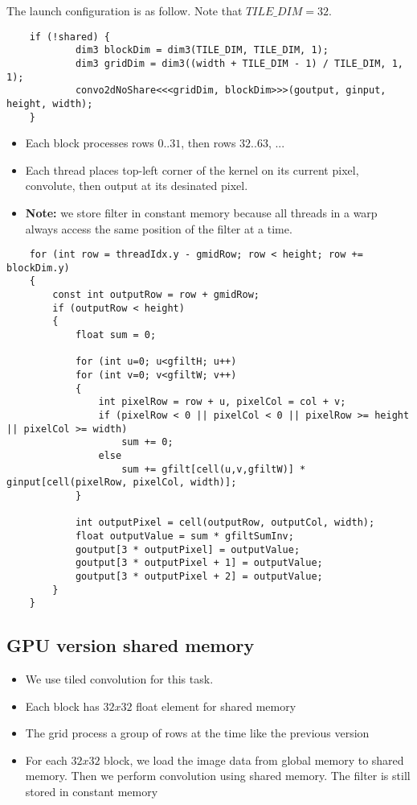 \documentclass[14pt]{article}
\begin{document}
The launch configuration is as follow. Note that $TILE\_DIM = 32$.
\begin{lstlisting}
    if (!shared) {
            dim3 blockDim = dim3(TILE_DIM, TILE_DIM, 1);
            dim3 gridDim = dim3((width + TILE_DIM - 1) / TILE_DIM, 1, 1);
            convo2dNoShare<<<gridDim, blockDim>>>(goutput, ginput, height, width);
    }
\end{lstlisting}

\begin{itemize}
    \item Each block processes rows $0..31$, then rows $32..63$, ... 
    \item Each thread places top-left corner of the kernel on its current pixel, convolute, then output at its desinated pixel.
    \item \textbf{Note:} we store filter in constant memory because all threads in a warp always access the same position of the filter at a time.
\end{itemize}

\begin{lstlisting}
    for (int row = threadIdx.y - gmidRow; row < height; row += blockDim.y)
    {
        const int outputRow = row + gmidRow;
        if (outputRow < height)
        {
            float sum = 0;

            for (int u=0; u<gfiltH; u++)
            for (int v=0; v<gfiltW; v++)
            {
                int pixelRow = row + u, pixelCol = col + v;
				if (pixelRow < 0 || pixelCol < 0 || pixelRow >= height || pixelCol >= width) 
					sum += 0;
				else 
					sum += gfilt[cell(u,v,gfiltW)] * ginput[cell(pixelRow, pixelCol, width)];
            }
            
            int outputPixel = cell(outputRow, outputCol, width);
            float outputValue = sum * gfiltSumInv;
            goutput[3 * outputPixel] = outputValue;
            goutput[3 * outputPixel + 1] = outputValue;
            goutput[3 * outputPixel + 2] = outputValue;
        }
    }
\end{lstlisting}

\subsection{GPU version shared memory}
\begin{itemize}
    \item We use tiled convolution for this task.
    \item Each block has $32x32$ float element for shared memory
    \item The grid process a group of rows at the time like the previous version
    \item For each $32x32$ block, we load the image data from global memory to shared memory. Then we perform convolution using shared memory. The filter is still stored in constant memory
\end{itemize}
\end{document}

